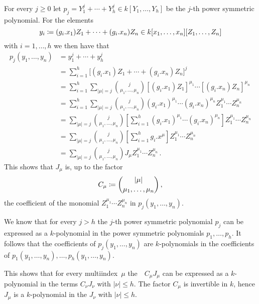 For every $j \geq 0$ let $p_j = Y_1^j + \dotsb + Y_h^j \in k[Y_1, \dotsc, Y_h]$ be the $j$-th power symmetric polynomial.
For the elements
\[
            y_i
  \coloneqq  (g_i.x_1) Z_1 + \dotsb + (g_i.x_n) Z_n
  \in       k[x_1, \dotsc, x_n][Z_1, \dotsc, Z_n]
\]
with $i = 1, \dotsc, h$ we then have that
\begingroup
\allowdisplaybreaks
\begin{align*}
      p_j(y_1, \dotsc, y_n)
  &=  y_1^j + \dotsb + y_h^j  \\
  &=  \sum_{i=1}^h \bigl[ (g_i.x_1) Z_1 + \dotsb + (g_i.x_n) Z_n \bigr]^j  \\
  &=  \sum_{i=1}^h \sum_{|\mu| = j}
      \binom{j}{\mu_1, \dotsc, \mu_n} [(g_i.x_1) Z_1]^{\mu_1} \dotsm [(g_i.x_n) Z_n]^{\mu_n}  \\
  &=  \sum_{i=1}^h \sum_{|\mu| = j}
      \binom{j}{\mu_1, \dotsc, \mu_n} (g_i.x_1)^{\mu_1} \dotsm (g_i.x_n)^{\mu_n} Z_1^{\mu_1} \dotsm Z_n^{\mu_n} \\
  &=  \sum_{|\mu| = j} \binom{j}{\mu_1, \dotsc, \mu_n}
      \left[
        \sum_{i=1}^h (g_i.x_1)^{\mu_1} \dotsm (g_i.x_n)^{\mu_n}
      \right]
      Z_1^{\mu_1} \dotsm Z_n^{\mu_n}  \\
  &=  \sum_{|\mu| = j} \binom{j}{\mu_1, \dotsc, \mu_n}
      \left[
        \sum_{i=1}^h g_i.x^\mu
      \right]
      Z_1^{\mu_1} \dotsm Z_n^{\mu_n}  \\
  &=  \sum_{|\mu| = j} \binom{j}{\mu_1, \dotsc, \mu_n} J_\mu Z_1^{\mu_1} \dotsm Z_n^{\mu_n} \,.
\end{align*}
\endgroup
This shows that $J_\mu$ is, up to the factor
\[
            C_\mu
  \coloneqq  \binom{|\mu|}{\mu_1, \dotsc, \mu_n} \,,
\]
the coefficient of the monomial $Z_1^{\mu_1} \dotsm Z_n^{\mu_n}$ in $p_j(y_1, \dotsc, y_n)$.

We know that for every $j > h$ the $j$-th power symmetric polynomial $p_j$ can be expressed as a $k$-polynomial in the power symmetric polynomials $p_1, \dotsc, p_h$.
It follows that the coefficients of $p_j(y_1, \dotsc, y_n)$ are $k$-polynomials in the coefficients of $p_1(y_1, \dotsc, y_n), \dotsc, p_h(y_1, \dotsc, y_n)$.

This shows that for every multiindex~$\mu$ the~~$C_\mu J_\mu$ can be expressed as a $k$-polynomial in the terms $C_\nu J_\nu$ with $|\nu| \leq h$.
The factor $C_\mu$ is invertible in $k$, hence $J_\mu$ is a $k$-polynomial in the $J_\nu$ with $|\nu| \leq h$.




